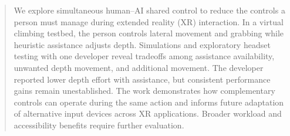 \begin{abstract}
We explore simultaneous human--AI shared control to reduce the controls a
person must manage during extended reality (XR) interaction. In a virtual climbing testbed,
the person controls lateral movement and grabbing while heuristic assistance
adjusts depth. Simulations and exploratory headset testing with one developer
reveal tradeoffs among assistance availability, unwanted depth movement, and
additional movement. The developer reported lower depth effort with assistance,
but consistent performance gains remain unestablished. The work demonstrates
how complementary controls can operate during the same action and informs
future adaptation of alternative input devices across XR applications.
Broader workload and accessibility benefits require further evaluation.
\end{abstract}

